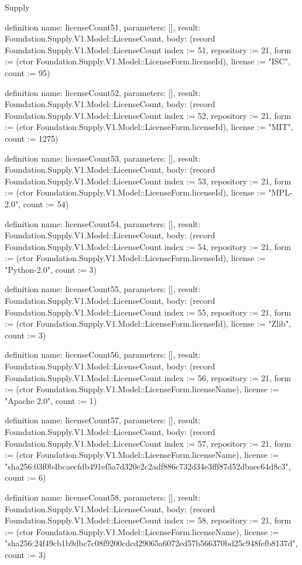\begin{lexlean}{Supply}
\begin{semanticmodule}
definition{
  name: licenseCount51,
  parameters: [],
  result: Foundation.Supply.V1.Model::LicenseCount,
  body: (record Foundation.Supply.V1.Model::LicenseCount {index := 51, repository := 21, form := (ctor Foundation.Supply.V1.Model::LicenseForm.licenseId), license := "ISC", count := 95})
}

definition{
  name: licenseCount52,
  parameters: [],
  result: Foundation.Supply.V1.Model::LicenseCount,
  body: (record Foundation.Supply.V1.Model::LicenseCount {index := 52, repository := 21, form := (ctor Foundation.Supply.V1.Model::LicenseForm.licenseId), license := "MIT", count := 1275})
}

definition{
  name: licenseCount53,
  parameters: [],
  result: Foundation.Supply.V1.Model::LicenseCount,
  body: (record Foundation.Supply.V1.Model::LicenseCount {index := 53, repository := 21, form := (ctor Foundation.Supply.V1.Model::LicenseForm.licenseId), license := "MPL-2.0", count := 54})
}

definition{
  name: licenseCount54,
  parameters: [],
  result: Foundation.Supply.V1.Model::LicenseCount,
  body: (record Foundation.Supply.V1.Model::LicenseCount {index := 54, repository := 21, form := (ctor Foundation.Supply.V1.Model::LicenseForm.licenseId), license := "Python-2.0", count := 3})
}

definition{
  name: licenseCount55,
  parameters: [],
  result: Foundation.Supply.V1.Model::LicenseCount,
  body: (record Foundation.Supply.V1.Model::LicenseCount {index := 55, repository := 21, form := (ctor Foundation.Supply.V1.Model::LicenseForm.licenseId), license := "Zlib", count := 3})
}

definition{
  name: licenseCount56,
  parameters: [],
  result: Foundation.Supply.V1.Model::LicenseCount,
  body: (record Foundation.Supply.V1.Model::LicenseCount {index := 56, repository := 21, form := (ctor Foundation.Supply.V1.Model::LicenseForm.licenseName), license := "Apache 2.0", count := 1})
}

definition{
  name: licenseCount57,
  parameters: [],
  result: Foundation.Supply.V1.Model::LicenseCount,
  body: (record Foundation.Supply.V1.Model::LicenseCount {index := 57, repository := 21, form := (ctor Foundation.Supply.V1.Model::LicenseForm.licenseName), license := "sha256:03f0b4bcaecfdb491ef5a7d320e2c2adf886c732d34e3fff87d52dbaec64d8c3", count := 6})
}

definition{
  name: licenseCount58,
  parameters: [],
  result: Foundation.Supply.V1.Model::LicenseCount,
  body: (record Foundation.Supply.V1.Model::LicenseCount {index := 58, repository := 21, form := (ctor Foundation.Supply.V1.Model::LicenseForm.licenseName), license := "sha256:24f49cb1b9dbc7c08f9200cdcd29065a6072ed57b566370bd25c948fefb8137d", count := 3})
}


\end{semanticmodule}
\end{lexlean}
